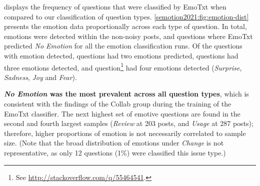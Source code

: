 \begin{table}[th]
\caption[Frequency of emotions per question type]{Frequency of emotions per question type.}
\label{semotion2021:tab:emotion-freq}
\footnotesize
{}
\end{table}

 displays the frequency of questions that were classified by EmoTxt when compared to our classification of question types. \cref{semotion2021:fig:emotion-dist} presents the emotion data proportionally across each type of question. In total, \SEMNumEmotionsDetected{} emotions were detected within the \SEMNumTotalNonNoisePosts{} non-noisy posts, and \SEMNumNoEmotionsDetected{} questions where EmoTxt predicted  \textit{No Emotion} for all the emotion classification runs.
Of the \SEMNumEmotionsDetected{} questions with emotion detected, \SEMNumQuestionsTwoEmo{} questions had two emotions predicted, \SEMNumQuestionsThreeEmo{} questions had three emotions detected, and \SEMNumQuestionsFourEmo{} question\footnote{See \url{http://stackoverflow.com/q/55464541}.} had four emotions detected (\textit{Surprise}, \textit{Sadness}, \textit{Joy} and \textit{Fear}). 

\textbf{\textit{No Emotion} was the most prevalent across all question types}, which is consistent with the findings of the Collab group during the training of the EmoTxt classifier. The next highest set of emotive questions are found in the second and fourth largest samples (\textit{Review} at 203 posts, and \textit{ Usage} at 287 posts); therefore, higher proportions of emotion is not necessarily correlated to sample size. (Note that the broad distribution of emotions under \textit{ Change} is not representative, as only 12 questions (1\%) were classified this issue type.)

